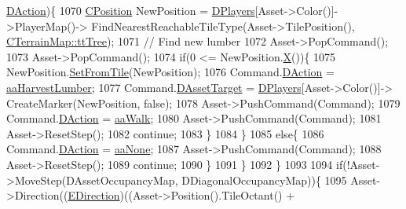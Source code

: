 \begin{DoxyCode}
{{      \hyperlink{structSAssetCommand_a8edd3b3d59a76d5514ba403bc8076a75}{DAction})\{
1070                         \hyperlink{classCPosition}{CPosition} NewPosition = \hyperlink{classCGameModel_a524436c3560b10e1c6d6fdd0b66565dc}{DPlayers}[Asset->Color()]->PlayerMap()->
      FindNearestReachableTileType(Asset->TilePosition(), \hyperlink{classCTerrainMap_aff2ab991e237269941416dd79d8871d4a15600fc22dc08ff5a3aec20930112f8c}{CTerrainMap::ttTree});
1071                         \textcolor{comment}{// Find new lumber}
1072                         Asset->PopCommand();
1073                         Asset->PopCommand();
1074                         \textcolor{keywordflow}{if}(0 <= NewPosition.\hyperlink{classCPosition_a9a6b94d3b91df1492d166d9964c865fc}{X}())\{
1075                             NewPosition.\hyperlink{classCPosition_a46994e6a8b8e3b4237edd7259ad844b6}{SetFromTile}(NewPosition);
1076                             Command.\hyperlink{structSAssetCommand_a8edd3b3d59a76d5514ba403bc8076a75}{DAction} = \hyperlink{GameDataTypes_8h_ab47668e651a3032cfb9c40ea2d60d670a4c44c3d83b3b67a8dd2248d11bedd0ee}{aaHarvestLumber};
1077                             Command.\hyperlink{structSAssetCommand_a3d9b43f6e59c386c48c41a65448a0c39}{DAssetTarget} = \hyperlink{classCGameModel_a524436c3560b10e1c6d6fdd0b66565dc}{DPlayers}[Asset->Color()]->
      CreateMarker(NewPosition, \textcolor{keyword}{false});
1078                             Asset->PushCommand(Command);
1079                             Command.\hyperlink{structSAssetCommand_a8edd3b3d59a76d5514ba403bc8076a75}{DAction} = \hyperlink{GameDataTypes_8h_ab47668e651a3032cfb9c40ea2d60d670a60ca9010aa62b73c1aab838ff4bf7276}{aaWalk};
1080                             Asset->PushCommand(Command);
1081                             Asset->ResetStep();
1082                             \textcolor{keywordflow}{continue};
1083                         \}
1084                     \}
1085                     \textcolor{keywordflow}{else}\{
1086                         Command.\hyperlink{structSAssetCommand_a8edd3b3d59a76d5514ba403bc8076a75}{DAction} = \hyperlink{GameDataTypes_8h_ab47668e651a3032cfb9c40ea2d60d670ac17cc5a0035320c060d7f8074143b507}{aaNone};
1087                         Asset->PushCommand(Command);
1088                         Asset->ResetStep();
1089                         \textcolor{keywordflow}{continue};    
1090                     \}
1091                 \}
1092             \}
1093 
1094             \textcolor{keywordflow}{if}(!Asset->MoveStep(DAssetOccupancyMap, DDiagonalOccupancyMap))\{
1095                 Asset->Direction((\hyperlink{GameDataTypes_8h_acb2b033915f6659a71a38b5aa6e4eb42}{EDirection})((Asset->Position().TileOctant() + 
}}
\end{DoxyCode}
